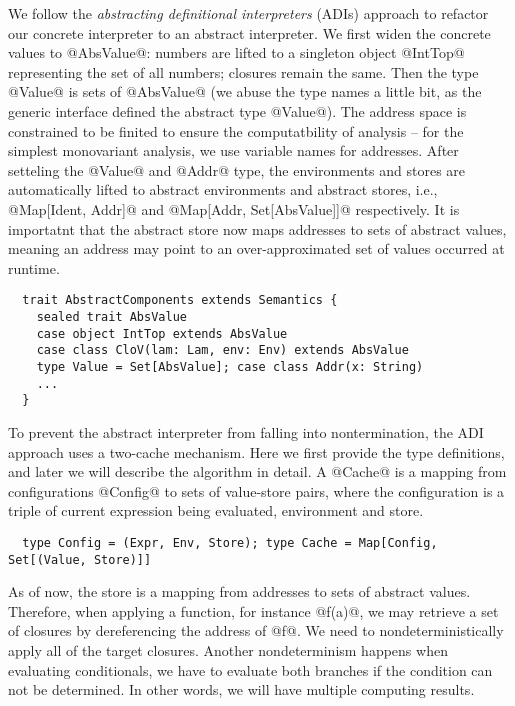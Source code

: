 We follow the \textit{abstracting definitional interpreters} (ADIs) approach
\cite{DBLP:journals/pacmpl/DaraisLNH17} to refactor our concrete interpreter to
an abstract interpreter. We first widen the concrete values to @AbsValue@: numbers
are lifted to a singleton object @IntTop@ representing the set of all numbers;
closures remain the same. Then the type @Value@ is sets of @AbsValue@ (we abuse
the type names a little bit, as the generic interface defined the abstract type
@Value@).
The address space is constrained to be finited to ensure the computatbility of
analysis -- for the simplest monovariant analysis, we use variable names for
addresses. After setteling the @Value@ and @Addr@ type, the environments and
stores are automatically lifted to abstract environments and abstract stores,
i.e., @Map[Ident, Addr]@ and @Map[Addr, Set[AbsValue]]@ respectively.
It is importatnt that the abstract store now maps addresses to sets of abstract
values, meaning an address may point to an over-approximated set of values
occurred at runtime.

\begin{lstlisting}
  trait AbstractComponents extends Semantics {
    sealed trait AbsValue
    case object IntTop extends AbsValue
    case class CloV(lam: Lam, env: Env) extends AbsValue
    type Value = Set[AbsValue]; case class Addr(x: String)
    ...
  }
\end{lstlisting}

To prevent the abstract interpreter from falling into nontermination, the ADI
approach uses a two-cache mechanism. Here we first provide the type
definitions, and later we will describe the algorithm in detail. A @Cache@ is a
mapping from configurations @Config@ to sets of value-store pairs, where the
configuration is a triple of current expression being evaluated, environment and
store.

\begin{lstlisting}
  type Config = (Expr, Env, Store); type Cache = Map[Config, Set[(Value, Store)]]
\end{lstlisting}

As of now, the store is a mapping from addresses to sets of abstract values.
Therefore, when applying a function, for instance @f(a)@, we may retrieve a set
of closures by dereferencing the address of @f@. We need to nondeterministically
apply all of the target closures.
Another nondeterminism happens when evaluating conditionals, we have to evaluate
both branches if the condition can not be determined. In other words, we will
have multiple computing results.

